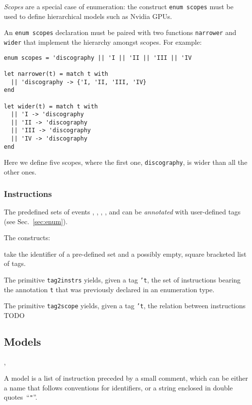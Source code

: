\emph{Scopes} are a special case of enumeration: the construct {\tt enum
scopes} must be used to define hierarchical models such as Nvidia GPUs.

An {\tt enum scopes} declaration must be paired with two functions {\tt narrower} and {\tt wider} that implement the hierarchy amongst scopes. For example:

\begin{verbatim}
enum scopes = 'discography || 'I || 'II || 'III || 'IV

let narrower(t) = match t with
  || 'discography -> {'I, 'II, 'III, 'IV} 
end

let wider(t) = match t with
  || 'I -> 'discography
  || 'II -> 'discography
  || 'III -> 'discography
  || 'IV -> 'discography
end
\end{verbatim}

Here we define five scopes, where the first one, {\tt discography}, is wider
than all the other ones.

\subsubsection*{Instructions}
The predefined sets of events , , ,
, and  can be \emph{annotated} with user-defined tags
(see Sec.~\ref{sec:enum}).

The constructs:

\begin{center}
\NT{[taglist]}  
\end{center}

take the identifier of a pre-defined set and a possibly empty, square bracketed
list of tags. 

The primitive {\tt tag2instrs} yields, given a tag {\tt 't}, the set of
instructions bearing the annotation {\tt t} that was previously declared in an
enumeration type.

The primitive {\tt tag2scope} yields, given a tag {\tt 't}, the relation
between instructions TODO  
 
\subsection{\label{language:model}Models}
\begin{syntax}
 \is {}   \erepet
\sep
{} \is {} \orelse  {}
\end{syntax}
A model is a list of instruction preceded by a small comment,
which can be either a name that follows \herd{} conventions for identifiers,
or a string enclosed in double quotes~``\verb+"+''.

